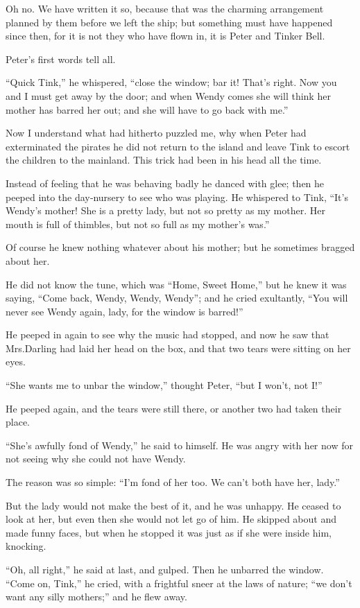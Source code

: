 Oh no.
We have written it so, because that was the charming arrangement planned by them before we left the ship;
but something must have happened since then,
for it is not they who have flown in, it is Peter and Tinker Bell.

Peter’s first words tell all.

“Quick Tink,” he whispered, “close the window;
bar it!
That’s right.
Now you and I must get away by the door;
and when Wendy comes she will think her mother has barred her out;
and she will have to go back with me.”

Now I understand what had hitherto puzzled me,
why when Peter had exterminated the pirates
he did not return to the island and leave Tink to escort the children to the mainland.
This trick had been in his head all the time.

Instead of feeling that he was behaving badly he danced with glee;
then he peeped into the day‐nursery to see who was playing.
He whispered to Tink, “It’s Wendy’s mother!
She is a pretty lady, but not so pretty as my mother.
Her mouth is full of thimbles, but not so full as my mother’s was.”

Of course he knew nothing whatever about his mother;
but he sometimes bragged about her.

He did not know the tune,
which was “Home, Sweet Home,”
but he knew it was saying, “Come back, Wendy, Wendy, Wendy”;
and he cried exultantly,
“You will never see Wendy again, lady, for the window is barred!”

He peeped in again to see why the music had stopped,
and now he saw that Mrs.\@ Darling had laid her head on the box,
and that two tears were sitting on her eyes.

“She wants me to unbar the window,” thought Peter,
“but I won’t, not I\@!”

He peeped again, and the tears were still there, or another two had taken their place.

“She’s awfully fond of Wendy,” he said to himself.
He was angry with her now for not seeing why she could not have Wendy.

The reason was so simple:
“I’m fond of her too.
We can’t both have her, lady.”

But the lady would not make the best of it, and he was unhappy.
He ceased to look at her, but even then she would not let go of him.
He skipped about and made funny faces,
but when he stopped it was just as if she were inside him, knocking.

“Oh, all right,” he said at last, and gulped.
Then he unbarred the window.
“Come on, Tink,” he cried, with a frightful sneer at the laws of nature;
“we don’t want any silly mothers;” and he flew away.

